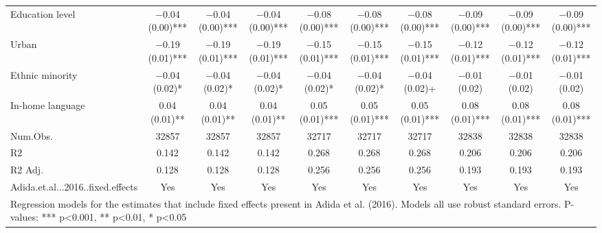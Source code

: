 \begin{table}
\begin{tabular}[t]{lccccccccc}
Education level & \num{-0.04} (\num{0.00})*** & \num{-0.04} (\num{0.00})*** & \num{-0.04} (\num{0.00})*** & \num{-0.08} (\num{0.00})*** & \num{-0.08} (\num{0.00})*** & \num{-0.08} (\num{0.00})*** & \num{-0.09} (\num{0.00})*** & \num{-0.09} (\num{0.00})*** & \num{-0.09} (\num{0.00})***\\
Urban & \num{-0.19} (\num{0.01})*** & \num{-0.19} (\num{0.01})*** & \num{-0.19} (\num{0.01})*** & \num{-0.15} (\num{0.01})*** & \num{-0.15} (\num{0.01})*** & \num{-0.15} (\num{0.01})*** & \num{-0.12} (\num{0.01})*** & \num{-0.12} (\num{0.01})*** & \num{-0.12} (\num{0.01})***\\
Ethnic minority & \num{-0.04} (\num{0.02})* & \num{-0.04} (\num{0.02})* & \num{-0.04} (\num{0.02})* & \num{-0.04} (\num{0.02})* & \num{-0.04} (\num{0.02})* & \num{-0.04} (\num{0.02})+ & \num{-0.01} (\num{0.02}) & \num{-0.01} (\num{0.02}) & \num{-0.01} (\num{0.02})\\
In-home language & \num{0.04} (\num{0.01})** & \num{0.04} (\num{0.01})** & \num{0.04} (\num{0.01})** & \num{0.05} (\num{0.01})*** & \num{0.05} (\num{0.01})*** & \num{0.05} (\num{0.01})*** & \num{0.08} (\num{0.01})*** & \num{0.08} (\num{0.01})*** & \num{0.08} (\num{0.01})***\\
\midrule
Num.Obs. & \num{32857} & \num{32857} & \num{32857} & \num{32717} & \num{32717} & \num{32717} & \num{32838} & \num{32838} & \num{32838}\\
R2 & \num{0.142} & \num{0.142} & \num{0.142} & \num{0.268} & \num{0.268} & \num{0.268} & \num{0.206} & \num{0.206} & \num{0.206}\\
R2 Adj. & \num{0.128} & \num{0.128} & \num{0.128} & \num{0.256} & \num{0.256} & \num{0.256} & \num{0.193} & \num{0.193} & \num{0.193}\\
Adida.et.al...2016..fixed.effects & Yes & Yes & Yes & Yes & Yes & Yes & Yes & Yes & Yes\\
\bottomrule
\multicolumn{10}{l}{\rule{0pt}{1em}Regression models for the estimates that include fixed effects present in Adida et al. (2016). Models all use robust standard errors. P-values: *** p<0.001, ** p<0.01, * p<0.05}\\
\end{tabular}
\end{table}
